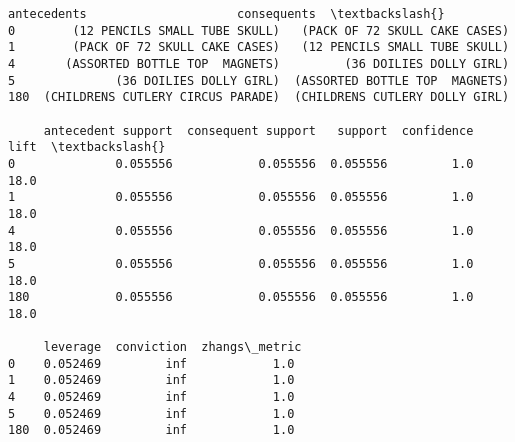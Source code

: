 \documentclass[11pt]{article}
\begin{document}
    \begin{Verbatim}[commandchars=\\\{\}]
                           antecedents                     consequents  \textbackslash{}
0        (12 PENCILS SMALL TUBE SKULL)   (PACK OF 72 SKULL CAKE CASES)
1        (PACK OF 72 SKULL CAKE CASES)   (12 PENCILS SMALL TUBE SKULL)
4       (ASSORTED BOTTLE TOP  MAGNETS)         (36 DOILIES DOLLY GIRL)
5              (36 DOILIES DOLLY GIRL)  (ASSORTED BOTTLE TOP  MAGNETS)
180  (CHILDRENS CUTLERY CIRCUS PARADE)  (CHILDRENS CUTLERY DOLLY GIRL)

     antecedent support  consequent support   support  confidence  lift  \textbackslash{}
0              0.055556            0.055556  0.055556         1.0  18.0
1              0.055556            0.055556  0.055556         1.0  18.0
4              0.055556            0.055556  0.055556         1.0  18.0
5              0.055556            0.055556  0.055556         1.0  18.0
180            0.055556            0.055556  0.055556         1.0  18.0

     leverage  conviction  zhangs\_metric
0    0.052469         inf            1.0
1    0.052469         inf            1.0
4    0.052469         inf            1.0
5    0.052469         inf            1.0
180  0.052469         inf            1.0
    \end{Verbatim}
\end{document}
